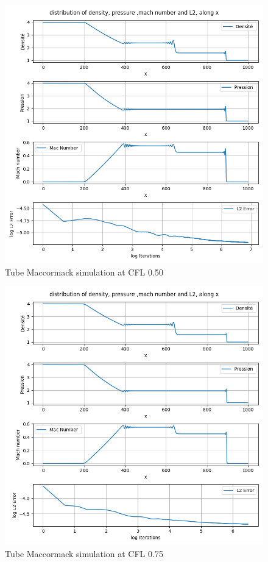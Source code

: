 \documentclass[12pt]{article}
\begin{document}
\begin{figure}[H] %
    \centering
    \includegraphics[width=\textwidth,height=\textheight,keepaspectratio]{PLOTS/tube_macormack_CFL05.png}
    \caption{Tube Maccormack simulation at CFL 0.50}
    \label{fig:your_label}
\end{figure}

\begin{figure}[H] %
    \centering
    \includegraphics[width=\textwidth,height=\textheight,keepaspectratio]{PLOTS/tube_macormack_CFL75.png}
    \caption{Tube Maccormack simulation at CFL 0.75}
    \label{fig:your_label}
\end{figure}
\end{document}
